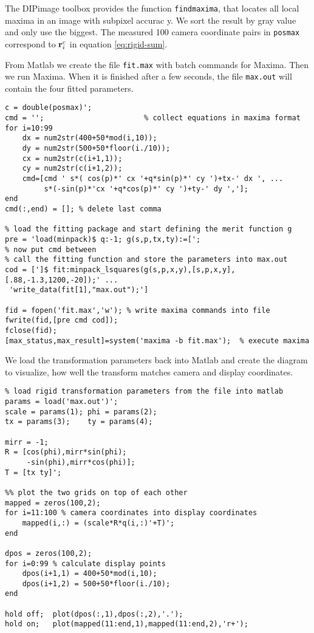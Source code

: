   The DIPimage toolbox provides the function \verb!findmaxima!, that
  locates all local maxima in an image with subpixel accurac y. We
  sort the result by gray value and only use the biggest.  The
  measured 100 camera coordinate pairs in \verb!posmax! correspond to
  $\mathbf{r}^c_i$ in equation \ref{eq:rigid-sum}.
 
  From Matlab we create the file \verb!fit.max! with batch commands
  for Maxima. Then we run Maxima. When it is finished after a few
  seconds, the file \verb!max.out! will contain the four fitted
  parameters.
 
{\small
\begin{verbatim}
c = double(posmax)';
cmd = '';                       % collect equations in maxima format
for i=10:99
    dx = num2str(400+50*mod(i,10));
    dy = num2str(500+50*floor(i./10));
    cx = num2str(c(i+1,1)); 
    cy = num2str(c(i+1,2));
    cmd=[cmd ' s*( cos(p)*' cx '+q*sin(p)*' cy ')+tx-' dx ', ...
         s*(-sin(p)*'cx '+q*cos(p)*' cy ')+ty-' dy ','];
end
cmd(:,end) = []; % delete last comma

% load the fitting package and start defining the merit function g
pre = 'load(minpack)$ q:-1; g(s,p,tx,ty):=[';
% now put cmd between
% call the fitting function and store the parameters into max.out
cod = [']$ fit:minpack_lsquares(g(s,p,x,y),[s,p,x,y],[.88,-1.3,1200,-20]);' ...
 'write_data(fit[1],"max.out");']

fid = fopen('fit.max','w'); % write maxima commands into file 
fwrite(fid,[pre cmd cod]);
fclose(fid);
[max_status,max_result]=system('maxima -b fit.max');  % execute maxima
\end{verbatim}}

  We load the transformation parameters back into Matlab and create
  the diagram  to visualize, how well the
  transform matches camera and display coordinates.

{\small
\begin{verbatim}
% load rigid transformation parameters from the file into matlab
params = load('max.out')'; 
scale = params(1); phi = params(2);
tx = params(3);    ty = params(4);

mirr = -1;
R = [cos(phi),mirr*sin(phi);
     -sin(phi),mirr*cos(phi)];
T = [tx ty]';

%% plot the two grids on top of each other
mapped = zeros(100,2);
for i=11:100 % camera coordinates into display coordinates
    mapped(i,:) = (scale*R*q(i,:)'+T)';
end

dpos = zeros(100,2);
for i=0:99 % calculate display points
    dpos(i+1,1) = 400+50*mod(i,10);
    dpos(i+1,2) = 500+50*floor(i./10);
end

hold off;  plot(dpos(:,1),dpos(:,2),'.');
hold on;   plot(mapped(11:end,1),mapped(11:end,2),'r+');
\end{verbatim}}

